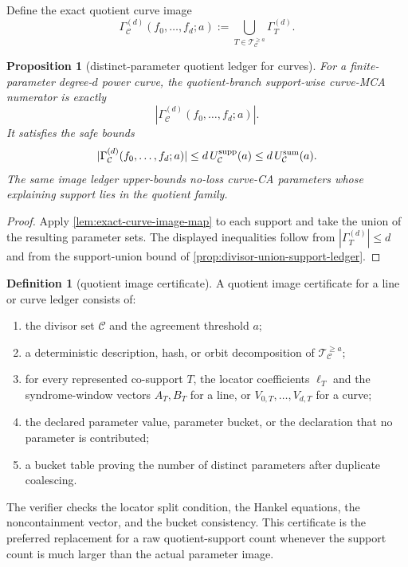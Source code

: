 \documentclass[11pt]{article}
\newtheorem{proposition}[theorem]{Proposition}
\theoremstyle{definition}
\newtheorem{definition}[theorem]{Definition}
\theoremstyle{remark}
\begin{document}
Define the exact quotient curve image
\[
        \Gamma_{\mathcal C}^{(d)}(f_0,\ldots,f_d;a)
        :=\bigcup_{T\in\mathcal T_{\mathcal C}^{\ge a}}\Gamma_T^{(d)} .
\]

\begin{proposition}[distinct-parameter quotient ledger for curves]
\label{prop:distinct-parameter-curve-ledger}
For a finite-parameter degree-$d$ power curve, the quotient-branch support-wise
curve-MCA numerator is exactly
\[
        |\Gamma_{\mathcal C}^{(d)}(f_0,
        \ldots,f_d;a)| .
\]
It satisfies the safe bounds
\[
        |\Gamma_{\mathcal C}^{(d)}(f_0,\ldots,f_d;a)|
        \le d\,U_{\mathcal C}^{\rm supp}(a)
        \le d\,U_{\mathcal C}^{\rm sum}(a).
\]
The same image ledger upper-bounds no-loss curve-CA parameters whose explaining
support lies in the quotient family.
\end{proposition}

\begin{proof}
Apply \cref{lem:exact-curve-image-map} to each support and take the union of the
resulting parameter sets.  The displayed inequalities follow from
$|\Gamma_T^{(d)}|\le d$ and from the support-union bound of
\cref{prop:divisor-union-support-ledger}.
\end{proof}

\begin{definition}[quotient image certificate]
\label{def:quotient-image-certificate}
A quotient image certificate for a line or curve ledger consists of:
\begin{enumerate}[label=\textup{(\roman*)}]
\item the divisor set $\mathcal C$ and the agreement threshold $a$;
\item a deterministic description, hash, or orbit decomposition of
$\mathcal T_{\mathcal C}^{\ge a}$;
\item for every represented co-support $T$, the locator coefficients
$\boldsymbol\ell_T$ and the syndrome-window vectors $A_T,B_T$ for a line, or
$V_{0,T},\ldots,V_{d,T}$ for a curve;
\item the declared parameter value, parameter bucket, or the declaration that no
parameter is contributed;
\item a bucket table proving the number of distinct parameters after duplicate
coalescing.
\end{enumerate}
The verifier checks the locator split condition, the Hankel equations, the
noncontainment vector, and the bucket consistency.  This certificate is the
preferred replacement for a raw quotient-support count whenever the support count
is much larger than the actual parameter image.
\end{definition}
\end{document}

